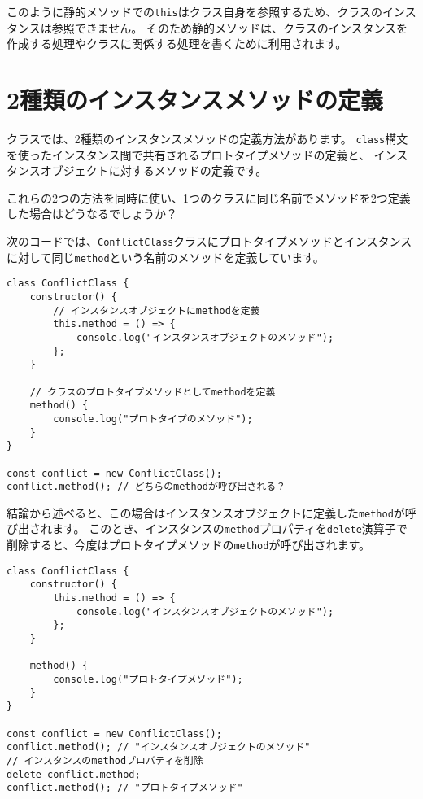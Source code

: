 このように静的メソッドでの\texttt{this}はクラス自身を参照するため、クラスのインスタンスは参照できません。
そのため静的メソッドは、クラスのインスタンスを作成する処理やクラスに関係する処理を書くために利用されます。

\hypertarget{two-instance-method-definition}{%
\section{2種類のインスタンスメソッドの定義}\label{two-instance-method-definition}}

クラスでは、2種類のインスタンスメソッドの定義方法があります。
\texttt{class}構文を使ったインスタンス間で共有されるプロトタイプメソッドの定義と、
インスタンスオブジェクトに対するメソッドの定義です。

これらの2つの方法を同時に使い、1つのクラスに同じ名前でメソッドを2つ定義した場合はどうなるでしょうか？

次のコードでは、\texttt{ConflictClass}クラスにプロトタイプメソッドとインスタンスに対して同じ\texttt{method}という名前のメソッドを定義しています。

\begin{lstlisting}
class ConflictClass {
    constructor() {
        // インスタンスオブジェクトにmethodを定義
        this.method = () => {
            console.log("インスタンスオブジェクトのメソッド");
        };
    }

    // クラスのプロトタイプメソッドとしてmethodを定義
    method() {
        console.log("プロトタイプのメソッド");
    }
}

const conflict = new ConflictClass();
conflict.method(); // どちらのmethodが呼び出される？
\end{lstlisting}

結論から述べると、この場合はインスタンスオブジェクトに定義した\texttt{method}が呼び出されます。
このとき、インスタンスの\texttt{method}プロパティを\texttt{delete}演算子で削除すると、今度はプロトタイプメソッドの\texttt{method}が呼び出されます。

\begin{lstlisting}
class ConflictClass {
    constructor() {
        this.method = () => {
            console.log("インスタンスオブジェクトのメソッド");
        };
    }

    method() {
        console.log("プロトタイプメソッド");
    }
}

const conflict = new ConflictClass();
conflict.method(); // "インスタンスオブジェクトのメソッド"
// インスタンスのmethodプロパティを削除
delete conflict.method;
conflict.method(); // "プロトタイプメソッド"
\end{lstlisting}

